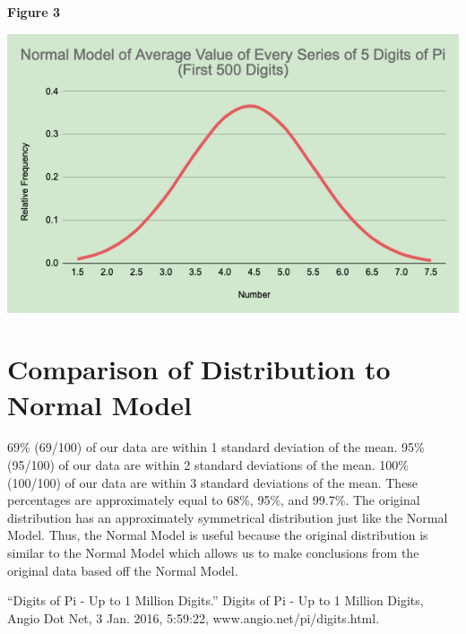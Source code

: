 \documentclass{article}
\begin{document}
\centerline{\textbf{Figure 3}}
 
{\includegraphics[width=\textwidth]{normdist.png}}
 
\section{Comparison of Distribution to Normal Model}
{69\% (69/100) of our data are within 1 standard deviation of the mean.}
{95\% (95/100) of our data are within 2 standard deviations of the mean.}
{100\% (100/100) of our data are within 3 standard deviations of the mean.}
{These percentages are approximately equal to 68\%, 95\%, and 99.7\%. The original distribution has an approximately symmetrical distribution just like the Normal Model. Thus, the Normal Model is useful because the original distribution is similar to the Normal Model which allows us to make conclusions from the original data based off the Normal Model.}
 
  
 
\begin{thebibliography}{1}
 
{“Digits of Pi - Up to 1 Million Digits.” Digits of Pi - Up to 1 Million Digits, Angio Dot Net, 3 Jan. 2016, 5:59:22, www.angio.net/pi/digits.html.}
 
\end{thebibliography}
 
\end{document}
